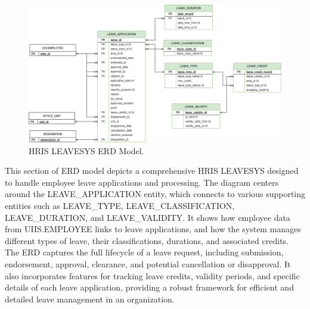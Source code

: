    \begin{figure}[H]
        \centering
        \includegraphics[width=1\linewidth]{figures/images/erd-leavesys.png}
        \caption{HRIS LEAVESYS ERD Model.}
        \label{fig:erd-leavesys}
    \end{figure}

    This section of ERD model depicts a comprehensive HRIS LEAVESYS designed to handle employee leave applications and processing. The diagram centers around the LEAVE\_APPLICATION entity, which connects to various supporting entities such as LEAVE\_TYPE, LEAVE\_CLASSIFICATION, LEAVE\_DURATION, and LEAVE\_VALIDITY. It shows how employee data from UIIS.EMPLOYEE links to leave applications, and how the system manages different types of leave, their classifications, durations, and associated credits. The ERD captures the full lifecycle of a leave request, including submission, endorsement, approval, clearance, and potential cancellation or disapproval. It also incorporates features for tracking leave credits, validity periods, and specific details of each leave application, providing a robust framework for efficient and detailed leave management in an organization.

